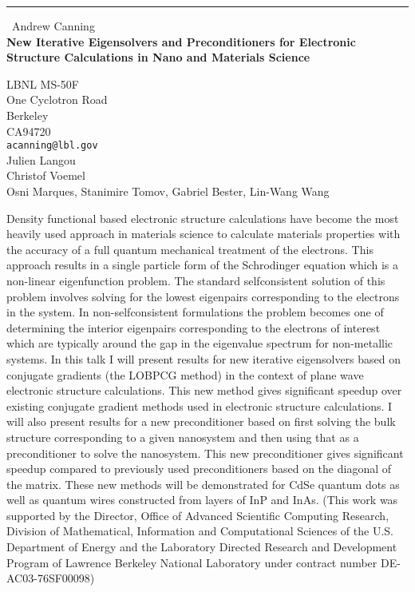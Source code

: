 \documentclass{report}
\begin{document}
\begin{center}
\rule{6in}{1pt} \
{\large Andrew Canning \\
{\bf New Iterative Eigensolvers and Preconditioners for Electronic Structure Calculations in Nano and Materials Science}}

LBNL MS-50F \\ One Cyclotron Road \\ Berkeley \\ CA94720
\\
{\tt acanning@lbl.gov}\\
Julien Langou\\
Christof Voemel\\
	Osni Marques, Stanimire Tomov, Gabriel Bester, Lin-Wang Wang \end{center}

Density functional based electronic structure calculations
have become the most heavily used approach in materials science to
calculate materials properties with the accuracy of a full quantum
mechanical treatment of the electrons. This approach results in a
single particle form of the Schrodinger equation which is a non-linear
eigenfunction problem. The standard selfconsistent solution of this problem
involves solving for the lowest eigenpairs corresponding to the electrons in
the system. In non-selfconsistent formulations the problem becomes one of
determining the interior eigenpairs corresponding to the electrons of interest
which are typically around the gap in the eigenvalue spectrum for non-metallic systems.
In this talk I will present results for new iterative eigensolvers based on conjugate
gradients (the LOBPCG method) in the context of plane wave electronic
structure calculations.
This new method gives significant speedup over existing conjugate gradient methods
used in electronic structure calculations. I will also
present results for a new preconditioner based on first solving the bulk structure
corresponding to a given nanosystem and then using that as a
preconditioner to solve the nanosystem.
This new preconditioner gives significant speedup compared to previously
used preconditioners
based on the diagonal of the matrix. These new methods will be demonstrated for
CdSe quantum dots as well as quantum wires constructed from layers of InP and InAs.
(This work was supported by the Director, Office of
Advanced Scientific Computing Research, Division of Mathematical,
Information and Computational Sciences of the U.S. Department
of Energy and the Laboratory Directed Research and Development
Program of Lawrence Berkeley National Laboratory
under contract number DE-AC03-76SF00098)
\end{document}
